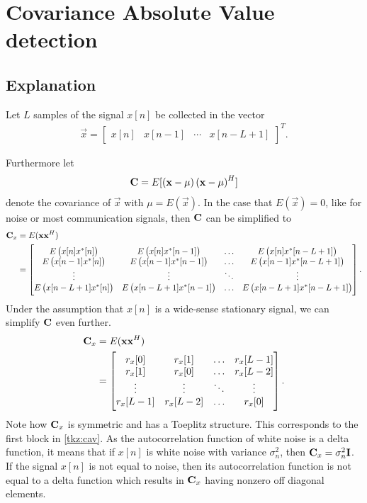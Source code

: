 \documentclass[a4paper, openany, oneside]{memoir}
\begin{document}
\section{Covariance Absolute Value detection}\label{sec:cav_derivation}

\subsection{Explanation}
Let $L$ samples of the signal $x[n]$ be collected in the vector
\begin{align*}
    \vec{x} = \begin{bmatrix}x[n]& x[n-1]& \cdots& x[n-L+1]\end{bmatrix}^T.
\end{align*}

Furthermore let
\begin{align*}
    \boldsymbol{\mathbf{C}} = E[\left(\boldsymbol{\mathbf{x}} - \mu \right)\left(\boldsymbol{\mathbf{x}} - \mu \right)^H]
\end{align*}
denote the covariance of $\vec{x}$ with $\mu = E(\vec{x})$. In the case that $E\left(\vec{x}\right)=0$, like for noise or most communication signals, then $\boldsymbol{\mathbf{C}}$ can be simplified to
\begin{align*}
\boldsymbol{\mathbf{C}}_x &= E(\boldsymbol{\mathbf{x}}\boldsymbol{\mathbf{x}}^H) \\
&= \begin{bmatrix} 
E\left(x[n]x^*[n]\right) & E\left(x[n]x^*[n-1]\right) & \ldots & E\left(x[n]x^*[n-L+1]\right) \\
E\left(x[n-1]x^*[n]\right) & E\left(x[n-1]x^*[n-1]\right) & \ldots & E\left(x[n-1]x^*[n-L+1]\right) \\
\vdots & \vdots & \ddots & \vdots \\
E\left(x[n-L+1]x^*[n]\right) & E\left(x[n-L+1]x^*[n-1]\right) & \ldots & E\left(x[n-L+1]x^*[n-L+1]\right) \\
\end{bmatrix}.
\end{align*}
Under the assumption that $x[n]$ is a wide-sense stationary signal, we can simplify $\boldsymbol{\mathbf{C}}$ even further. 
\begin{align*}
\boldsymbol{\mathbf{C}}_x&= E(\boldsymbol{\mathbf{x}}\boldsymbol{\mathbf{x}}^H) \\
&= \begin{bmatrix} 
r_x[0] & r_x[1] & \ldots & r_x[L-1] \\
r_x[1] & r_x[0] & \ldots & r_x[L-2] \\
\vdots & \vdots & \ddots & \vdots \\
r_x[L-1] & r_x[L-2] & \ldots & r_x[0] \\
\end{bmatrix}.
\end{align*}
Note how $\boldsymbol{\mathbf{C}}_x$ is symmetric and has a Toeplitz structure. This corresponds to the first block in \cref{tkz:cav}. As  the autocorrelation function of white noise is a delta function, it means that  if $x[n]$ is white noise with variance $\sigma_n^2$, then $\boldsymbol{\mathbf{C}}_x = \sigma_n^2\boldsymbol{\mathbf{I}}$.
If the signal $x[n]$ is not equal to noise, then its autocorrelation function is not equal to a delta function which results in $\boldsymbol{\mathbf{C}}_x$ having nonzero off diagonal elements.
\end{document}
